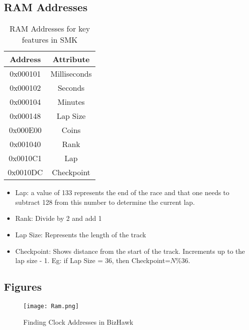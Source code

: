 \subsection{RAM Addresses}
\label{sec:RAMVals}
\begin{table}
\centering
    \begin{tabular}{|c|c|}
        \hline
        Address  & Attribute\\\hline
        0x000101 & Milliseconds\\\hline
        0x000102 & Seconds\\\hline
        0x000104 & Minutes\\\hline
        0x000148 & Lap Size\\\hline
        0x000E00 & Coins\\\hline
        0x001040 & Rank\\\hline
        0x0010C1 & Lap\\\hline
        0x0010DC & Checkpoint\\\hline
\end{tabular}
    \caption{RAM Addresses for key features in SMK}
\end{table}
\begin{itemize}
    \item Lap: a value of 133 represents the end of the race
and that one needs to subtract 128 from this number to determine the current
lap.
    \item Rank: Divide by 2 and add 1
    \item Lap Size: Represents the length of the track
    \item Checkpoint: Shows distance from the start of the track. Increments up to the lap size - 1. Eg: if Lap Size = 36, then Checkpoint=$N\%36$.
\end{itemize}


\FloatBarrier
\subsection{Figures}
\begin{figure}[ht]
\centering
\texttt{[image: Ram.png]}
\caption{Finding Clock Addresses in BizHawk}
\label{fig:hex}
\end{figure}
